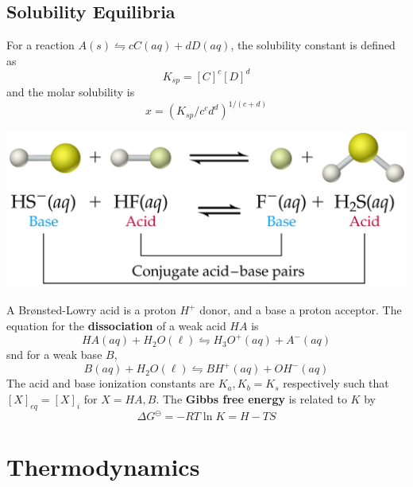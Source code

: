 \documentclass{tufte-book}
\renewcommand{\emph}[1]{\textbf{#1}}
\begin{document}
\section{Solubility Equilibria}
For a reaction $A(s) \leftrightharpoons cC(aq) + dD(aq)$, the solubility constant is defined as \begin{equation}
  K_{sp} = [C]^c [D]^d
\end{equation}
and the molar solubility is \begin{equation}
  x = (K_{sp}/c^cd^d)^{1/(c+d)}
\end{equation}
%
\begin{marginfigure}[5mm]
\begin{center}
  \includegraphics[width=\textwidth]{acidbase}
\end{center}
\end{marginfigure}
%
A Brønsted-Lowry acid is a proton $H^+$ donor, and a base a proton acceptor. The equation for the \emph{dissociation} of a weak acid $HA$ is \begin{equation}
  HA(aq) + H_2O (\ell) \leftrightharpoons H_3O^+ (aq) + A^- (aq)
\end{equation}
snd for a weak base $B$,
\begin{equation}
  B(aq) + H_2O (\ell) \leftrightharpoons BH^+ (aq) + OH^-(aq)
\end{equation}
The acid and base ionization constants are $K_a,K_b = K_s$ respectively such that $[X]_{eq} = [X]_i$ for $X = HA, B$. The \emph{Gibbs free energy} is related to $K$ by \begin{equation}
\Delta G^\ominus = -RT \ln K = H-TS
\end{equation}


\chapter{Thermodynamics}
\end{document}
